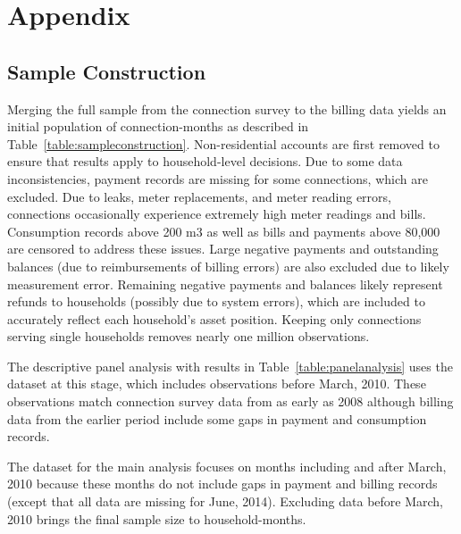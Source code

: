 \documentclass[12pt,table]{article}
\begin{document}




\pagebreak

\section{Appendix}



\subsection{Sample Construction}\label{appendix:sampleconstruction}

Merging the full sample from the connection survey to the billing data yields an initial population of connection-months as described in Table~\ref{table:sampleconstruction}.  Non-residential accounts are first removed to ensure that results apply to household-level decisions.  Due to some data inconsistencies, payment records are missing for some connections, which are excluded.  Due to leaks, meter replacements, and meter reading errors, connections occasionally experience extremely high meter readings and bills.  Consumption records above 200 m3 as well as bills and payments above 80,000 are censored to address these issues.  Large negative payments and outstanding balances (due to reimbursements of billing errors) are also excluded due to likely measurement error.  Remaining negative payments and balances likely represent refunds to households (possibly due to system errors), which are included to accurately reflect each household's asset position.  Keeping only connections serving single households removes nearly one million observations.

The descriptive panel analysis with results in Table~\ref{table:panelanalysis} uses the dataset at this stage, which includes observations before March, 2010.  These observations match connection survey data from as early as 2008 although billing data from the earlier period include some gaps in payment and consumption records.

The dataset for the main analysis focuses on months including and after March, 2010 because these months do not include gaps in payment and billing records (except that all data are missing for June, 2014).  Excluding data before March, 2010 brings the final sample size to household-months.
\end{document}
